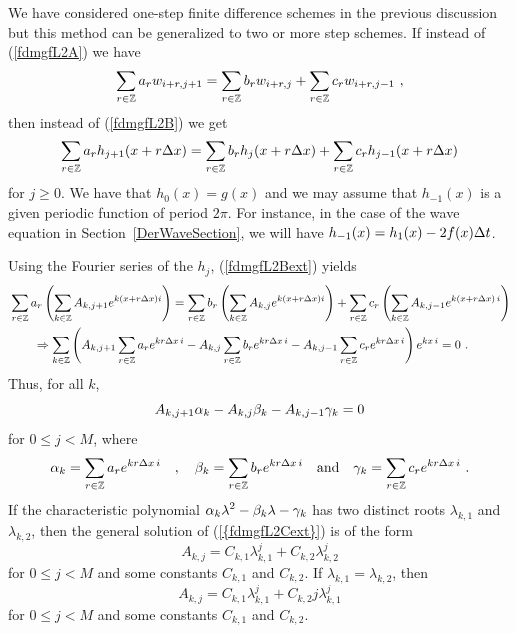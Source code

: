 \begin{rmk}
We have considered one-step finite difference schemes in the previous
discussion but this method can be generalized to two or more step
schemes.  If instead of (\ref{fdmgfL2A}) we have
\begin{equation}\label{fdmgfL2Aext}
\sum_{r\in\ZZ} a_r w_{i+r,j+1} =
\sum_{r\in \ZZ} b_r w_{i+r,j} + \sum_{r\in \ZZ} c_r w_{i+r,j-1} \ ,
\end{equation}
then instead of (\ref{fdmgfL2B}) we get
\begin{equation}\label{fdmgfL2Bext}
\sum_{r\in\mathbb{Z}} a_r h_{j+1}(x+r\Delta{x}) =
\sum_{r\in\mathbb{Z}} b_r h_{j}(x+r\Delta{x})
+ \sum_{r\in\mathbb{Z}} c_r h_{j-1}(x+r\Delta{x})
\end{equation}
for $j\geq 0$.  We have that $h_0(x) = g(x)$ and we may assume that
$h_{-1}(x)$ is a given periodic function of period $2\pi$.  For
instance, in the case of the wave equation in
Section~\ref{DerWaveSection}, we will have
$h_{-1}(x) = h_1(x) - 2 f(x) \Delta{t}$.   \label{fdmgfL2ext}

Using the Fourier series of the $h_j$, (\ref{fdmgfL2Bext}) yields
\begin{align*}
& \sum_{r\in\mathbb{Z}} a_r \left( \sum_{k\in \mathbb{Z}} A_{k,j+1} e^{k(x+r\Delta{x}) i}\right)
= \sum_{r\in\mathbb{Z}} b_r \left( \sum_{k\in \mathbb{Z}} A_{k,j} e^{k (x+r\Delta{x}) i}\right) 
+ \sum_{r\in\mathbb{Z}} c_r \left( \sum_{k\in \mathbb{Z}} A_{k,j-1} e^{k(x+r\Delta{x})\,i}\right)
\\
& \qquad \Rightarrow
\sum_{k\in \mathbb{Z}}\left(A_{k,j+1}
\sum_{r\in\mathbb{Z}} a_r e^{k r \Delta{x}\, i}
- A_{k,j}  \sum_{r\in\mathbb{Z}} b_r  e^{k r \Delta{x}\, i}
- A_{k,j-1} \sum_{r\in\mathbb{Z}} c_r  e^{k r \Delta{x}\, i}\right) e^{k x\,i} = 0 \ .
\end{align*}
Thus, for all $k$,
\begin{equation}\label{{fdmgfL2Cext}}
  A_{k,j+1} \alpha_k -  A_{k,j}  \beta_k - A_{k,j-1} \gamma_k = 0
\end{equation}
for $0\leq j < M$, where
\begin{equation} \label{{fdmgfL2Dext}}
\alpha_k = \sum_{r\in\ZZ} a_r e^{k r \dtx{x}\, i} \quad , \quad
\beta_k = \sum_{r\in\ZZ} b_r  e^{k r \dtx{x}\, i} \quad \text{and} \quad
\gamma_k = \sum_{r\in\ZZ} c_r  e^{k r \dtx{x}\, i} \ .
\end{equation}
If the characteristic polynomial
$\displaystyle \alpha_k \lambda^2 - \beta_k \lambda - \gamma_k$ has two distinct
roots $\lambda_{k,1}$ and $\lambda_{k,2}$, then the general solution of
(\ref{{fdmgfL2Cext}}) is of the form
\[
A_{k,j} = C_{k,1} \lambda_{k,1}^j + C_{k,2} \lambda_{k,2}^j 
\]
for $0 \leq j < M$ and some constants $C_{k,1}$ and $C_{k,2}$.  If
$\lambda_{k,1} = \lambda_{k,2}$, then
\[
A_{k,j} = C_{k,1} \lambda_{k,1}^j + C_{k,2} j \lambda_{k,1}^j 
\]
for $0 \leq j < M$ and some constants $C_{k,1}$ and $C_{k,2}$.


\end{rmk}
